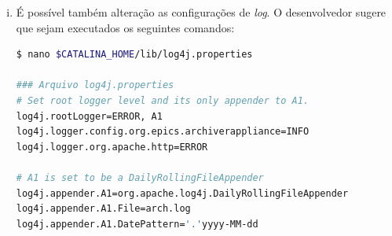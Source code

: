 \begin {enumerate}[i.]
\begin{lstlisting}[language=bash, style=nonumbers]
export ARCHAPPL_APPLIANCES=$INSTALL_DIR/epics-appliances/lnls_appliances.xml
export ARCHAPPL_MYIDENTITY="lnls_epics_appliance"
\end{lstlisting}


O desenvolvedor sugere também trocar a porta padrão usada pelo \textit{Apache
Tomcat} pela porta usada pelo módulo \texttt{mgmt}, isto é, 11995, e comentar
as linhas sobre o uso do conector AJP. Para isso, siga a sequência abaixo.

\begin{lstlisting}[language=bash, style=nonumbers]
$ nano $CATALINA_HOME/conf/server.xml
### Edite a porta de forma a obter
[...]
<Connector port="11995" protocol="HTTP/1.1"
               connectionTimeout="20000"
               redirectPort="8443" />
[...]
### Comente o trecho
<!-- Define an AJP 1.3 Connector on port 8009 
    <Connector port="8009" protocol="AJP/1.3" redirectPort="8443" /> -->
\end{lstlisting}

Execute o \textit{script} disponibilizado pelo desenvolvedor para criar as 4
instâncias do \textit{Apache Tomcat}.

\begin{lstlisting}[language=bash, style=nonumbers]
$ source /home/user/.bashrc
$ cd $INSTALL_DIR/epics-archiver-appliance/install_scripts
$ ./deployMultipleTomcats.py $INSTALL_DIR/epics-appliances
\end{lstlisting}

Serão criadas 4 pastas dentro de \texttt{\$INSTALL\_DIR/epics-appliances}, uma
para cada módulo.

\item É possível também alteração as configurações de \textit{log}. O
desenvolvedor sugere que sejam executados os seguintes comandos:

\begin{lstlisting}[language=bash, style=nonumbers]
$ nano $CATALINA_HOME/lib/log4j.properties

### Arquivo log4j.properties
# Set root logger level and its only appender to A1.
log4j.rootLogger=ERROR, A1
log4j.logger.config.org.epics.archiverappliance=INFO
log4j.logger.org.apache.http=ERROR

# A1 is set to be a DailyRollingFileAppender
log4j.appender.A1=org.apache.log4j.DailyRollingFileAppender
log4j.appender.A1.File=arch.log
log4j.appender.A1.DatePattern='.'yyyy-MM-dd


\end{lstlisting}
\end{enumerate}
